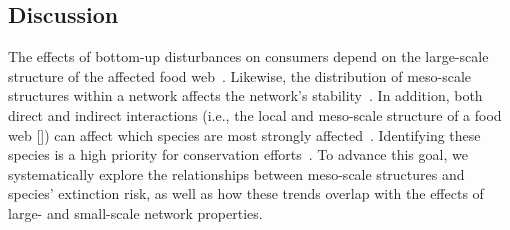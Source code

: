\documentclass[12pt]{article}
\begin{document}
\begin{spacing}{2.0}
        
    


        




\section*{Discussion}

    The effects of bottom-up disturbances on consumers depend on the large-scale structure of the affected food web~\citep{Dunne2002, Eklof2006, PascualDunne2006}.
    Likewise, the distribution of meso-scale structures within a network affects the network's stability~\citep{prill2005dynamic, bascompte2005simple}.
    In addition, both direct and indirect interactions (i.e., the local and meso-scale structure of a food web  [\citealp[]{Cirtwill2018FoodWebs}]) can affect which species are most strongly affected~\citep{curtsdotter2011robustness, dunne2009cascading, Eklof2006}. 
    Identifying these species is a high priority for conservation efforts~\citep{Bottrilletal2008}.
    To advance this goal, we systematically explore the relationships between meso-scale structures and species' extinction risk, as well as how these trends overlap with the effects of large- and small-scale network properties.


\end{spacing}
\end{document}
